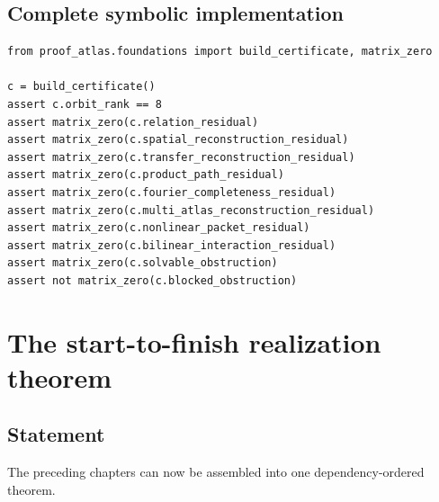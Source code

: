 \documentclass[11pt,oneside]{book}
\theoremstyle{definition}
\theoremstyle{remark}
\begin{document}
\section{Complete symbolic implementation}
\begin{lstlisting}
from proof_atlas.foundations import build_certificate, matrix_zero

c = build_certificate()
assert c.orbit_rank == 8
assert matrix_zero(c.relation_residual)
assert matrix_zero(c.spatial_reconstruction_residual)
assert matrix_zero(c.transfer_reconstruction_residual)
assert matrix_zero(c.product_path_residual)
assert matrix_zero(c.fourier_completeness_residual)
assert matrix_zero(c.multi_atlas_reconstruction_residual)
assert matrix_zero(c.nonlinear_packet_residual)
assert matrix_zero(c.bilinear_interaction_residual)
assert matrix_zero(c.solvable_obstruction)
assert not matrix_zero(c.blocked_obstruction)
\end{lstlisting}

\chapter{The start-to-finish realization theorem}\label{ch:start-finish-theorem}

\section{Statement}
The preceding chapters can now be assembled into one dependency-ordered theorem.
\end{document}
